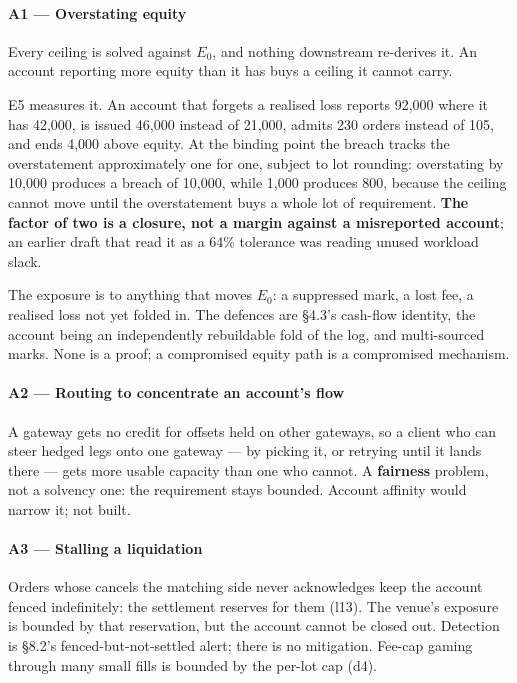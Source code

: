 \documentclass[10pt,a4paper]{article}
\begin{document}
\paragraph{A1 --- Overstating equity}\label{a1-overstating-equity}

Every ceiling is solved against \(E_0\), and nothing downstream re-derives it. An
account reporting more equity than it has buys a ceiling it cannot carry.

E5 measures it. An account that forgets a realised loss reports 92,000 where it
has 42,000, is issued 46,000 instead of 21,000, admits 230 orders instead of 105,
and ends 4,000 above equity. At the binding point the breach tracks the
overstatement approximately one for one, subject to lot rounding: overstating by
10,000 produces a breach of 10,000, while 1,000 produces 800, because the ceiling
cannot move until the overstatement buys a whole lot of requirement.
\textbf{The factor of two is a closure, not a margin against a misreported account};
an earlier draft that read it as a 64\% tolerance was reading unused workload
slack.

The exposure is to anything that moves \(E_0\): a suppressed mark, a lost fee, a
realised loss not yet folded in. The defences are §4.3's cash-flow identity, the
account being an independently rebuildable fold of the log, and multi-sourced
marks. None is a proof; a compromised equity path is a compromised mechanism.

\paragraph{A2 --- Routing to concentrate an account's flow}\label{a2-routing-to-concentrate-an-accounts-flow}

A gateway gets no credit for offsets held on other gateways, so a client who can
steer hedged legs onto one gateway --- by picking it, or retrying until it lands
there --- gets more usable capacity than one who cannot. A \textbf{fairness} problem,
not a solvency one: the requirement stays bounded. Account affinity would narrow
it; not built.

\paragraph{A3 --- Stalling a liquidation}\label{a3-stalling-a-liquidation}

Orders whose cancels the matching side never acknowledges keep the account
fenced indefinitely: the settlement reserves for them (l13). The venue's exposure
is bounded by that reservation, but the account cannot be closed out. Detection
is §8.2's fenced-but-not-settled alert; there is no mitigation. Fee-cap gaming
through many small fills is bounded by the per-lot cap (d4).
\end{document}

